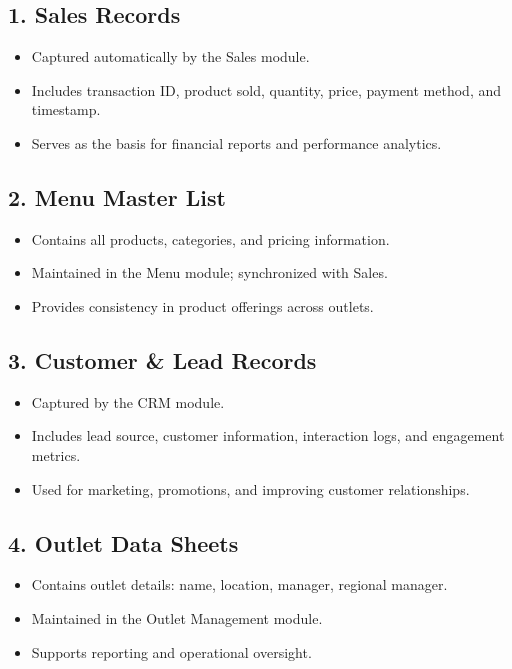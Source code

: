\subsection*{1. Sales Records}
\begin{itemize}
    \item Captured automatically by the Sales module.
    \item Includes transaction ID, product sold, quantity, price, payment method, and timestamp.
    \item Serves as the basis for financial reports and performance analytics.
\end{itemize}

\subsection*{2. Menu Master List}
\begin{itemize}
    \item Contains all products, categories, and pricing information.
    \item Maintained in the Menu module; synchronized with Sales.
    \item Provides consistency in product offerings across outlets.
\end{itemize}

\subsection*{3. Customer \& Lead Records}
\begin{itemize}
    \item Captured by the CRM module.
    \item Includes lead source, customer information, interaction logs, and engagement metrics.
    \item Used for marketing, promotions, and improving customer relationships.
\end{itemize}

\subsection*{4. Outlet Data Sheets}
\begin{itemize}
    \item Contains outlet details: name, location, manager, regional manager.
    \item Maintained in the Outlet Management module.
    \item Supports reporting and operational oversight.
\end{itemize}

